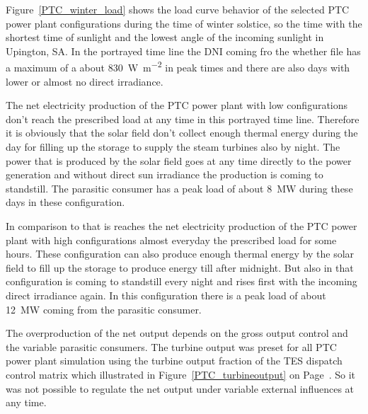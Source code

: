 Figure~\ref{PTC_winter_load} shows the load curve behavior of the selected PTC power plant configurations during the time of winter solstice, so the time with the shortest time of sunlight and the lowest angle of the incoming sunlight in Upington, SA. In the portrayed time line the DNI coming fro the whether file has a maximum of a about \SI{830}{\watt\per\square\metre} in peak times and there are also days with lower or almost no direct irradiance. 

The net electricity production of the PTC power plant with low configurations don't reach the prescribed load at any time in this portrayed time line. Therefore it is obviously that the solar field don't collect enough thermal energy during the day for filling up the storage to supply the steam turbines also by night. The power that is produced by the solar field goes at any time directly to the power generation and without direct sun irradiance the production is coming to standstill. The parasitic consumer has a peak load of about \SI{8}{MW} during these days in these configuration.

In comparison to that is reaches the net electricity production of the PTC power plant with high configurations almost everyday the prescribed load for some hours. These configuration can also produce enough thermal energy by the solar field to fill up the storage to produce energy till after midnight. But also in that configuration is coming to standstill every night and rises first with the incoming direct irradiance again. In this configuration there is a peak load of about \SI{12}{MW} coming from the parasitic consumer. 

The overproduction of the net output depends on the gross output control and the variable parasitic consumers. The turbine output was preset for all PTC power plant simulation using the turbine output fraction of the TES dispatch control matrix which illustrated in Figure~\ref{PTC_turbineoutput} on Page~\pageref{PTC_turbineoutput}. So it was not possible to regulate the net output under variable external influences at any time. 

